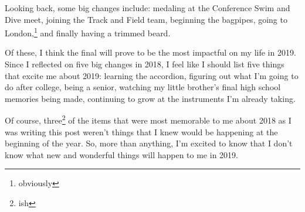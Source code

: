 \documentclass[12pt]{article}[titlepage]
\newcommand{\1}{\={a}}
\newcommand{\2}{\={e}}
\newcommand{\3}{\={\i}}
\newcommand{\4}{\=o}
\newcommand{\5}{\=u}
\newcommand{\6}{\={A}}
\renewcommand{\,}{\textsuperscript{,}}
\begin{document}
Looking back, some big changes include:
medaling at the Conference Swim and Dive meet,
joining the Track and Field team,
beginning the bagpipes,
going to London,\footnote{obviously}
and finally having a trimmed beard.

Of these, I think the final will prove to be the most impactful on my life in 2019.
Since I reflected on five big changes in 2018, I feel like I should list five things that excite me about 2019:
learning the accordion,
figuring out what I'm going to do after college,
being a senior,
watching my little brother's final high school memories being made,
continuing to grow at the instruments I'm already taking.

Of course, three\footnote{ish} of the items that were most memorable to me about 2018 as I was writing this post weren't things that I knew would be happening at the beginning of the year.
So, more than anything, I'm excited to know that I don't know what new and wonderful things will happen to me in 2019. 
\end{document}
